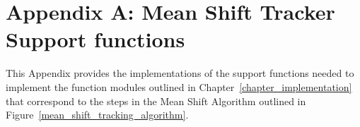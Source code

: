 \appendix
\chapter{Appendix A: Mean Shift Tracker Support functions} \label{appendix_mean_shift_tracker}
This Appendix provides the implementations of the support functions needed to
implement the function modules outlined in Chapter~\ref{chapter_implementation}
that correspond to the steps in the Mean Shift Algorithm outlined in
Figure~\ref{mean_shift_tracking_algorithm}.

\chapter{}
